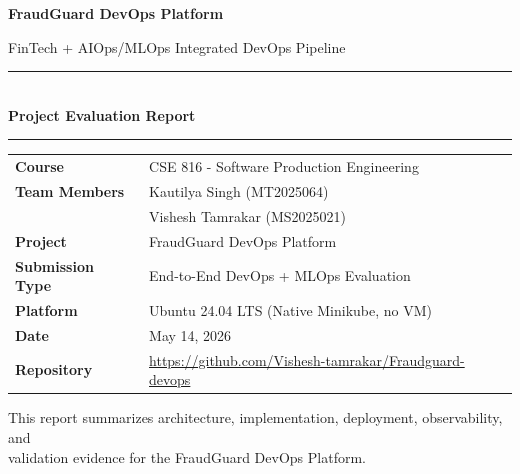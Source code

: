 \documentclass[12pt,a4paper]{article}
\begin{document}
\begin{titlepage}
    \thispagestyle{empty}
    \centering
    \vspace*{1cm}
    
    {\huge \textbf{FraudGuard DevOps Platform} \par}
    \vspace{0.5cm}
    {\large FinTech + AIOps/MLOps Integrated DevOps Pipeline \par}
    
    \vspace{1.5cm}
    \rule{\linewidth}{0.8pt}\\[0.5cm]
    {\Huge \textbf{Project Evaluation Report}}\\[0.5cm]
    \rule{\linewidth}{0.8pt}
    \vspace{2cm}
    
    \begin{table}[H]
        \centering
        \renewcommand{\arraystretch}{1.2}
        \begin{tabular}{lp{10cm}}
            \textbf{Course} & CSE 816 - Software Production Engineering \\
            \textbf{Team Members} & Kautilya Singh (MT2025064) \\
            & Vishesh Tamrakar (MS2025021) \\
            \textbf{Project} & FraudGuard DevOps Platform \\
            \textbf{Submission Type} & End-to-End DevOps + MLOps Evaluation \\
            \textbf{Platform} & Ubuntu 24.04 LTS (Native Minikube, no VM) \\
            \textbf{Date} & May 14, 2026 \\
            \textbf{Repository} & \url{https://github.com/Vishesh-tamrakar/Fraudguard-devops}
        \end{tabular}
    \end{table}
    
    \vfill
    
    \begin{center}
    {\normalsize This report summarizes architecture, implementation, deployment, observability, and \\ validation evidence for the FraudGuard DevOps Platform. \par}
    \end{center}
    \vspace{1cm}
\end{titlepage}
\end{document}

